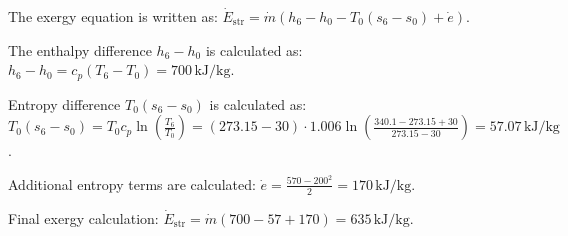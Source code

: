 The exergy equation is written as:  
\( \dot{E}_{\text{str}} = \dot{m} (h_6 - h_0 - T_0 (s_6 - s_0) + \dot{e}) \).  

The enthalpy difference \( h_6 - h_0 \) is calculated as:  
\( h_6 - h_0 = c_p (T_6 - T_0) = 700 \, \text{kJ/kg} \).  

Entropy difference \( T_0 (s_6 - s_0) \) is calculated as:  
\( T_0 (s_6 - s_0) = T_0 c_p \ln \left( \frac{T_6}{T_0} \right) = (273.15 - 30) \cdot 1.006 \ln \left( \frac{340.1 - 273.15 + 30}{273.15 - 30} \right) = 57.07 \, \text{kJ/kg} \).  

Additional entropy terms are calculated:  
\( \dot{e} = \frac{570 - 200^2}{2} = 170 \, \text{kJ/kg} \).  

Final exergy calculation:  
\( \dot{E}_{\text{str}} = \dot{m} (700 - 57 + 170) = 635 \, \text{kJ/kg} \).